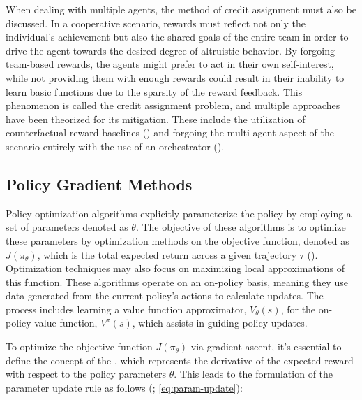     \bigskip
    
    \noindent When dealing with multiple agents, the method of credit assignment must also be discussed. In a cooperative scenario, rewards must reflect not only the individual's achievement but also the shared goals of the entire team in order to drive the agent towards the desired degree of altruistic behavior. By forgoing team-based rewards, the agents might prefer to act in their own self-interest, while not providing them with enough  rewards could result in their inability to learn basic functions due to the sparsity of the reward feedback. This phenomenon is called the credit assignment problem, and multiple approaches have been theorized for its mitigation. These include the utilization of counterfactual reward baselines (\cite{foerster2017counterfactual}) and forgoing the multi-agent aspect of the scenario entirely with the use of an orchestrator (\cite{chen2023emergent}).


    \subsection{Policy Gradient Methods}
    \label{sec:Policy-Gradient-Methods}

        \noindent Policy optimization algorithms explicitly parameterize the policy by employing a set of parameters denoted as $\theta$. The objective of these algorithms is to optimize these parameters by optimization methods on the objective function, denoted as $J(\pi_\theta)$, which is the total expected return across a given trajectory $\tau$ (\textcolor{deepblue}{\cite{SpinningUp2018}}). Optimization techniques may also focus on maximizing local approximations of this function. These algorithms operate on an on-policy basis, meaning they use data generated from the current policy's actions to calculate updates. The process includes learning a value function approximator, $V_\theta(s)$, for the on-policy value function, $V^{\pi}(s)$, which assists in guiding policy updates.
        
        \bigskip
        
        \noindent To optimize the objective function $J(\pi_\theta)$ via gradient ascent, it's essential to define the concept of the , which represents the derivative of the expected reward with respect to the policy parameters $\theta$. This leads to the formulation of the parameter update rule as follows (\textcolor{deepblue}{\cite{SpinningUp2018}; \autoref{eq:param-update}}):
        
